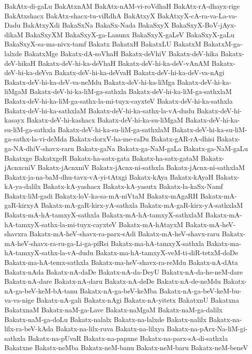 {BakAtx-di-gaLu
BakAtxnAM
BakAtx-nAM-vi-roVdhaH
BakAtx-rA-dhayx-rige
BakAtxshacx
BakAtx-shacx-tu-viRdhA
BakAtxyX
BakAtxyX-cA-ra-va-La-va-Dadu
BakAtxyXdi
BakaSxNa
BakaSx-Nada
BakaSxyX
BakaSxyX-BoV-jAyx-dikaM
BakaSxyXM
BakaSxyX-ga-Lanunx
BakaSxyX-gaLeV
BakaSxyX-gaLu
BakaSxyX-sa-ma-nivx-tamf
Bakatx
BakatxH
BakatxLU
BakatxM
BakatxM-ga-lalxde
BakatxMge
Bakatx-dA-soVhaH
Bakatx-deVhiV
Bakatx-deV-hika
Bakatx-deV-hikaH
Bakatx-deV-hi-ka-deVhaH
Bakatx-deV-hi-ka-deV-vAnAM
Bakatx-deV-hi-ka-deVva
Bakatx-deV-hi-ka-deVvaH
Bakatx-deV-hi-ka-deV-va-nAgi
Bakatx-deV-hi-ka-deV-va-neMdu
Bakatx-deV-hi-ka-liMga
Bakatx-deV-hi-ka-liMgaM
Bakatx-deV-hi-ka-liM-ga-sathxla
Bakatx-deV-hi-ka-liM-ga-sathxlaM
Bakatx-deV-hi-ka-liM-ga-sathx-la-mi-tuyx-cayxteV
Bakatx-deV-hi-ka-sathxla
Bakatx-deV-hi-ka-sathxlaM
Bakatx-deV-hi-ka-sathx-la-vA-dudu
Bakatx-deV-hi-kasayx
Bakatx-deV-hi-kashacx
Bakatx-deV-hi-ka-su-liMgaM
Bakatx-deV-hi-ka-su-liM-ga-sathxla
Bakatx-deV-hi-ka-su-liM-ga-sathxlaM
Bakatx-deV-hi-ka-su-liM-ga-sathx-la-vi-deMda
Bakatx-dorxV-ha-me-raDu
Bakatx-gAR-rA-dhisi
Bakatx-ga-NA-dhiV-shavx-raru
Bakatx-gaNa
Bakatx-ga-NaM-gaLa
Bakatx-ga-NaM-gaLu
Bakatxge
BakatxgeR
Bakatx-ha-satx-gata
Bakatx-ha-satx-gataM
Bakatx-jAcnxcniV
Bakatx-jAcnxniV
Bakatx-jAcnx-ni-sathxla
Bakatx-jAcnx-ni-sathxlaM
Bakatx-ja-na-baM-dhu-tavx-vA-yi-tAtxgi
Bakatx-kAya
Bakatx-kAyaH
Bakatx-kA-ya-dalilx
Bakatx-kA-yashacx
Bakatx-kA-yasutx
Bakatx-la-kaSx-Namf
Bakatx-liM-gadi
Bakatx-loV-ka-sa-mA-niVtaM
Bakatx-mAgaRH
Bakatx-mA-gaR-kirxyA
Bakatx-mA-gaR-kirx-yA-sathxla
Bakatx-mA-gaR-kirx-yA-sathxlaM
Bakatx-mA-hA-tamxyX-sathxla
Bakatx-mA-hA-tamxyX-sathxlaM
Bakatx-mA-hA-tamxyX-sathx-la-mi-tuyx-cayxteV
Bakatx-mA-hAtayxM
Bakatx-mA-heV-shavxra
Bakatx-mA-heV-shavx-ra-parx-sAdi
Bakatx-mA-heV-shavx-raru
Bakatx-mA-heV-shavx-ra-ru-ga-Li-ga-piRsi
Bakatx-ma-hA-tamxyX-sathxla
Bakatx-ma-hA-tamxyX-sathx-la-vA-dudu
Bakatx-ma-hA-tamxyX-veM-ti-diR-tetxM-doDe
Bakatx-ma-hA-temx-sathxla
Bakatx-ma-heV-shavx-ra-reMdu
Bakatx-nA-dAta
Bakatx-nAda
Bakatx-nA-daDe
Bakatx-nA-da-DeyU
Bakatx-nA-da-he-neM-dare
Bakatx-nA-dare
Bakatx-nA-daru
Bakatx-nA-deDe
Bakatx-nA-de-neMdu
Bakatx-nA-ga-beV-keM-bA-tanu
Bakatx-nA-ga-beV-keMba
Bakatx-nA-ga-beV-keM-bu-va-va-nige
Bakatx-nA-gali
Bakatx-nAgi
Bakatx-nA-yitetx
BakatxnU
Bakatxna
BakatxnaM
Bakatx-naM-ga-Lave
Bakatx-naMgaM
Bakatx-naM-ga-dalilx
Bakatx-naM-ga-doLu
Bakatx-nalalx
Bakatx-na-lalxde
Bakatx-nalilx
Bakatx-na-lilx-ra-beV-kAda
Bakatx-na-lilx-ruva
Bakatx-na-lilxya
Bakatx-na-pArx-Na-liM-gi-sathxla
Bakatx-na-pUvaR
Bakatx-na-papxne
Bakatx-na-parx-sA-di-sathxla
Bakatxne
Bakatx-neMba
Bakatx-neM-banu
Bakatx-neM-baru
Bakatx-neM-beneV
}
